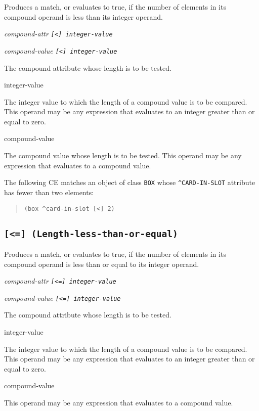 Produces a match, or evaluates to true, if the number of elements in
its compound operand is less than its integer operand.

\Format

\ct\it{compound-attr} \tt{[<]} \it{integer-value}

\it{compound-value} \tt{[<]} \it{integer-value}

\begin{operands}
\item[\ct{compound-attr}]

  The compound attribute whose length is to be tested.

\item[integer-value]

  The integer value to which the length of a compound value is to be
  compared. This operand may be any expression that evaluates to an
  integer greater than or equal to zero.

\item[compound-value]

  The compound value whose length is to be tested. This operand may be
  any expression that evaluates to a compound value.
\end{operands}

\Example

The following CE matches an object of class \verb|BOX| whose
\verb|^CARD-IN-SLOT| attribute has fewer than two elements:

\begin{quote}
\begin{verbatim}
(box ^card-in-slot [<] 2)
\end{verbatim}
\end{quote}

\subsection{\tt{[<=]} (Length-less-than-or-equal)}

Produces a match, or evaluates to true, if the number of elements in
its compound operand is less than or equal to its integer operand.

\Format

\ct\it{compound-attr} \tt{[<=]} \it{integer-value}

\it{compound-value} \tt{[<=]} \it{integer-value}

\begin{operands}
\item[\ct{compound-attr}]

  The compound attribute whose length is to be tested.

\item[integer-value]

  The integer value to which the length of a compound value is to be
  compared. This operand may be any expression that evaluates to an
  integer greater than or equal to zero.

\item[compound-value]

  This operand may be any expression that evaluates to a compound
  value.
\end{operands}

